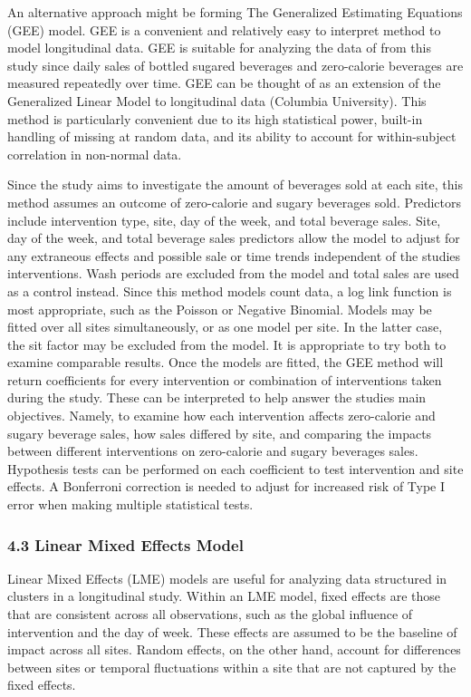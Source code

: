 \documentclass[
]{article}
\begin{document}
An alternative approach might be forming The Generalized Estimating
Equations (GEE) model. GEE is a convenient and relatively easy to
interpret method to model longitudinal data. GEE is suitable for
analyzing the data of from this study since daily sales of bottled
sugared beverages and zero-calorie beverages are measured repeatedly
over time. GEE can be thought of as an extension of the Generalized
Linear Model to longitudinal data (Columbia University). This method is
particularly convenient due to its high statistical power, built-in
handling of missing at random data, and its ability to account for
within-subject correlation in non-normal data.

Since the study aims to investigate the amount of beverages sold at each
site, this method assumes an outcome of zero-calorie and sugary
beverages sold. Predictors include intervention type, site, day of the
week, and total beverage sales. Site, day of the week, and total
beverage sales predictors allow the model to adjust for any extraneous
effects and possible sale or time trends independent of the studies
interventions. Wash periods are excluded from the model and total sales
are used as a control instead. Since this method models count data, a
log link function is most appropriate, such as the Poisson or Negative
Binomial. Models may be fitted over all sites simultaneously, or as one
model per site. In the latter case, the sit factor may be excluded from
the model. It is appropriate to try both to examine comparable results.
Once the models are fitted, the GEE method will return coefficients for
every intervention or combination of interventions taken during the
study. These can be interpreted to help answer the studies main
objectives. Namely, to examine how each intervention affects
zero-calorie and sugary beverage sales, how sales differed by site, and
comparing the impacts between different interventions on zero-calorie
and sugary beverages sales. Hypothesis tests can be performed on each
coefficient to test intervention and site effects. A Bonferroni
correction is needed to adjust for increased risk of Type I error when
making multiple statistical tests.

\hypertarget{linear-mixed-effects-model}{%
\subsubsection{4.3 Linear Mixed Effects
Model}\label{linear-mixed-effects-model}}

Linear Mixed Effects (LME) models are useful for analyzing data
structured in clusters in a longitudinal study. Within an LME model,
fixed effects are those that are consistent across all observations,
such as the global influence of intervention and the day of week. These
effects are assumed to be the baseline of impact across all sites.
Random effects, on the other hand, account for differences between sites
or temporal fluctuations within a site that are not captured by the
fixed effects.
\end{document}
